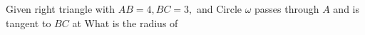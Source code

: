 Given right triangle  with $ AB = 4, BC = 3,$ and  Circle $ \omega$ passes through $ A$ and is tangent to $ BC$ at  What is the radius of 